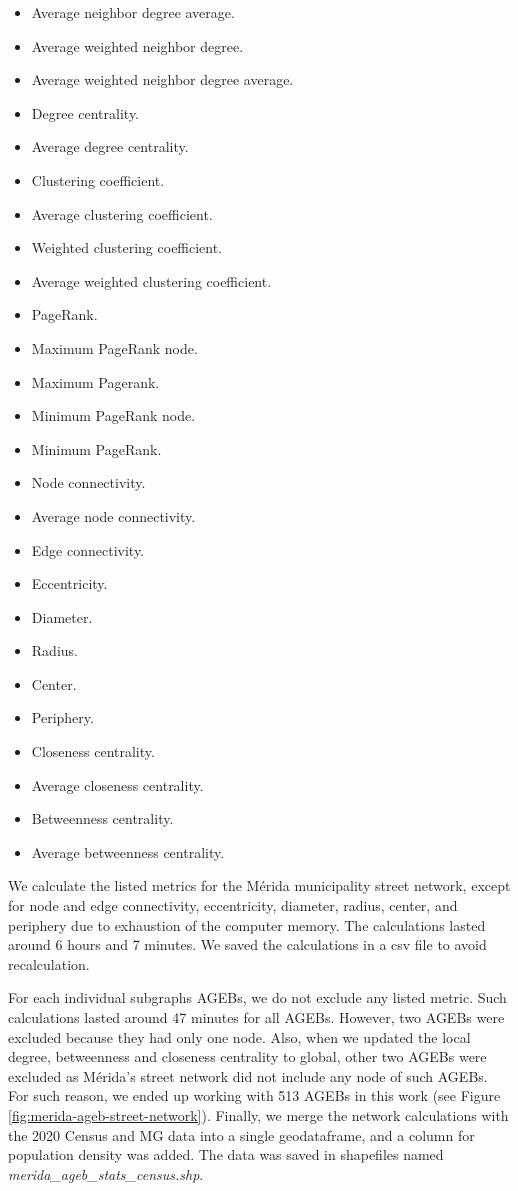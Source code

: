 \begin{itemize}
\item Average neighbor degree average.
\item Average weighted neighbor degree.
\item Average weighted neighbor degree average.
\item Degree centrality.
\item Average degree centrality.
\item Clustering coefficient.
\item Average clustering coefficient.
\item Weighted clustering coefficient.
\item Average weighted clustering coefficient.
\item PageRank.
\item Maximum PageRank node.
\item Maximum Pagerank.
\item Minimum PageRank node.
\item Minimum PageRank.
\item Node connectivity.
\item Average node connectivity.
\item Edge connectivity.
\item Eccentricity.
\item Diameter.
\item Radius.
\item Center.
\item Periphery.
\item Closeness centrality.
\item Average closeness centrality.
\item Betweenness centrality.
\item Average betweenness centrality.
\end{itemize}

We calculate the listed metrics for the Mérida municipality street network, except for node and edge connectivity, eccentricity, diameter, radius, center, and periphery due to exhaustion of the computer memory. The calculations lasted around 6 hours and 7 minutes. We saved the calculations in a csv file to avoid recalculation.

For each individual subgraphs AGEBs, we do not exclude any listed metric. Such calculations lasted around 47 minutes for all AGEBs. However, two AGEBs were excluded because they had only one node. Also, when we updated the local degree, betweenness and closeness centrality to global, other two AGEBs were excluded as Mérida's street network did not include any node of such AGEBs. For such reason, we ended up working with 513 AGEBs in this work (see Figure \ref{fig:merida-ageb-street-network}). Finally, we merge the network calculations with the 2020 Census and MG data into a single geodataframe, and a column for population density was added. The data was saved in shapefiles named \textit{merida\_ageb\_stats\_census.shp}.

